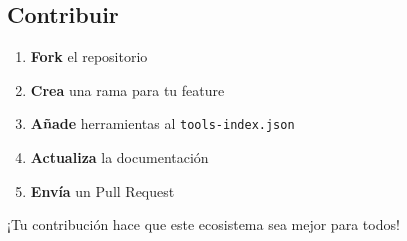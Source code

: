 \documentclass[
  11pt,
  letterpaper,
  oneside,
  openany]{scrbook}
\providecommand{\tightlist}{%
  \setlength{\itemsep}{0pt}\setlength{\parskip}{0pt}}
\begin{document}
\subsection{Contribuir}\label{contribuir}

\begin{enumerate}
\def\labelenumi{\arabic{enumi}.}
\tightlist
\item
  \textbf{Fork} el repositorio
\item
  \textbf{Crea} una rama para tu feature
\item
  \textbf{Añade} herramientas al \texttt{tools-index.json}
\item
  \textbf{Actualiza} la documentación
\item
  \textbf{Envía} un Pull Request
\end{enumerate}

¡Tu contribución hace que este ecosistema sea mejor para todos! 🚀


\backmatter
\end{document}
